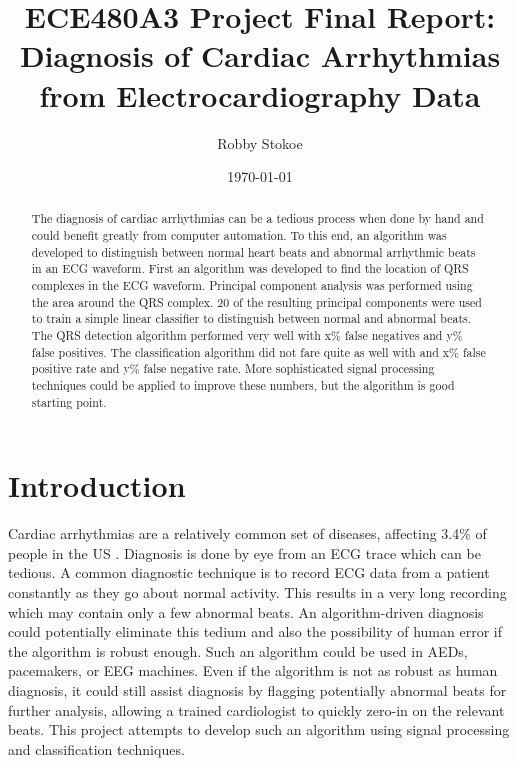 \documentclass[12pt,letter]{article}
\title{ECE480A3 Project Final Report: \\ Diagnosis of Cardiac Arrhythmias from 
Electrocardiography Data}
\author{Robby Stokoe}
\date{\today}
\begin{document}
\maketitle

\begin{abstract}
    The diagnosis of cardiac arrhythmias can be a tedious process when done by
    hand and could benefit greatly from computer automation.  To this end, an 
    algorithm was developed to distinguish between normal heart beats and
    abnormal arrhythmic beats in an ECG waveform.  First an algorithm was
    developed to find the location of QRS complexes in the ECG waveform.
    Principal component analysis was performed using the area around the QRS 
    complex.  20 of the resulting principal components were used to train a
    simple linear classifier to distinguish between normal and abnormal beats.
    The QRS detection algorithm performed very well with x\% false negatives and
    y\% false positives.  The classification algorithm did not fare quite as 
    well with and x\% false positive rate and y\% false negative rate.  More
    sophisticated signal processing techniques could be applied to improve these
    numbers, but the algorithm is good starting point.  
\end{abstract}

\section{Introduction} 
Cardiac arrhythmias are a relatively common set of diseases, affecting 3.4\% of
people in the US \cite{cdc95}.  Diagnosis is done by eye from an ECG trace which
can be tedious.  A common diagnostic technique is to record ECG data from a
patient constantly as they go about normal activity.  This results in a very
long recording which may contain only a few abnormal beats.  An algorithm-driven
diagnosis could potentially eliminate this tedium and also the possibility of
human error if the algorithm is robust enough.  Such an algorithm could be used
in AEDs, pacemakers, or EEG machines.  Even if the algorithm is not as robust as
human diagnosis, it could still assist diagnosis by flagging potentially
abnormal beats for further analysis, allowing a trained cardiologist to quickly
zero-in on the relevant beats.  This project attempts to develop such an
algorithm using signal processing and classification techniques.  
\end{document}
